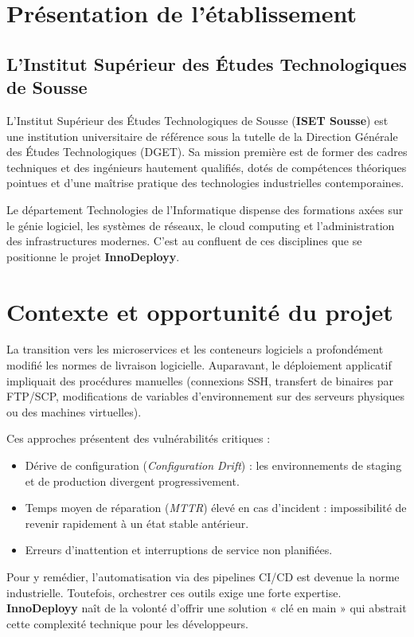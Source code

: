 \documentclass[12pt,a4paper,oneside]{report}
\begin{document}
\section{Présentation de l'établissement}
\subsection{L'Institut Supérieur des Études Technologiques de Sousse}
L'Institut Supérieur des Études Technologiques de Sousse (\textbf{ISET Sousse}) est une institution universitaire de référence sous la tutelle de la Direction Générale des Études Technologiques (DGET). Sa mission première est de former des cadres techniques et des ingénieurs hautement qualifiés, dotés de compétences théoriques pointues et d'une maîtrise pratique des technologies industrielles contemporaines.

Le département Technologies de l'Informatique dispense des formations axées sur le génie logiciel, les systèmes de réseaux, le cloud computing et l'administration des infrastructures modernes. C'est au confluent de ces disciplines que se positionne le projet \textbf{InnoDeployy}.

\section{Contexte et opportunité du projet}
La transition vers les microservices et les conteneurs logiciels a profondément modifié les normes de livraison logicielle. Auparavant, le déploiement applicatif impliquait des procédures manuelles (connexions SSH, transfert de binaires par FTP/SCP, modifications de variables d'environnement sur des serveurs physiques ou des machines virtuelles). 

Ces approches présentent des vulnérabilités critiques :
\begin{itemize}[label=$\bullet$]
    \item Dérive de configuration (\textit{Configuration Drift}) : les environnements de staging et de production divergent progressivement.
    \item Temps moyen de réparation (\textit{MTTR}) élevé en cas d'incident : impossibilité de revenir rapidement à un état stable antérieur.
    \item Erreurs d'inattention et interruptions de service non planifiées.
\end{itemize}

Pour y remédier, l'automatisation via des pipelines CI/CD est devenue la norme industrielle. Toutefois, orchestrer ces outils exige une forte expertise. \textbf{InnoDeployy} naît de la volonté d'offrir une solution « clé en main » qui abstrait cette complexité technique pour les développeurs.
\end{document}
